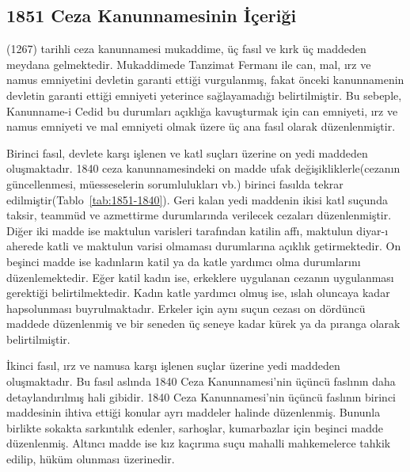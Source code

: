 \subsection{1851 Ceza Kanunnamesinin İçeriği}
\indent{}(1267) tarihli ceza kanunnamesi mukaddime, üç fasıl ve kırk üç maddeden meydana gelmektedir. Mukaddimede Tanzimat Fermanı ile can, mal, ırz ve namus emniyetini devletin garanti ettiği vurgulanmış,
fakat önceki kanunnamenin devletin garanti ettiği emniyeti yeterince sağlayamadığı belirtilmiştir. Bu sebeple, Kanunname-i Cedid bu durumları açıklığa kavuşturmak için can emniyeti, ırz ve namus emniyeti ve mal emniyeti 
olmak üzere üç ana fasıl olarak düzenlenmiştir.

Birinci fasıl, devlete karşı işlenen ve katl suçları üzerine on yedi maddeden oluşmaktadır. 1840 ceza kanunnamesindeki on madde ufak değişikliklerle(cezanın güncellenmesi, müesseselerin sorumlulukları vb.) birinci fasılda tekrar edilmiştir(Tablo~\ref{tab:1851-1840}). 
Geri kalan yedi maddenin ikisi katl suçunda taksir, teammüd ve azmettirme durumlarında verilecek cezaları düzenlenmiştir. Diğer iki madde ise maktulun varisleri tarafından katilin affı, maktulun diyar-ı aherede katli ve maktulun varisi olmaması
durumlarına açıklık getirmektedir. On beşinci madde ise kadınların katil ya da katle yardımcı olma durumlarını düzenlemektedir. Eğer katil kadın ise, erkeklere uygulanan cezanın uygulanması gerektiği belirtilmektedir. Kadın katle yardımcı olmuş ise,
ıslah oluncaya kadar hapsolunması buyrulmaktadır. Erkeler için aynı suçun cezası on dördüncü maddede düzenlenmiş ve bir seneden üç seneye kadar kürek ya da pıranga olarak belirtilmiştir.

İkinci fasıl, ırz ve namusa karşı işlenen suçlar üzerine yedi maddeden oluşmaktadır. Bu fasıl aslında 1840 Ceza Kanunnamesi'nin üçüncü faslının daha detaylandırılmış hali gibidir. 1840 Ceza Kanunnamesi'nin üçüncü faslının birinci maddesinin 
ihtiva ettiği konular ayrı maddeler halinde düzenlenmiş. Bununla birlikte sokakta sarkıntılık edenler, sarhoşlar, kumarbazlar için beşinci madde düzenlenmiş. Altıncı madde ise kız kaçırıma suçu mahalli mahkemelerce tahkik edilip, hüküm olunması
üzerinedir.

